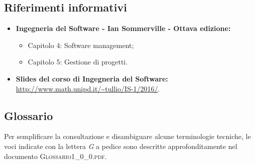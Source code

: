 \subsection{Riferimenti informativi}
\begin{itemize}
\item \textbf{Ingegneria del Software - Ian Sommerville - Ottava edizione:}
	\begin{itemize}
		\item Capitolo 4: Software management;
		\item Capitolo 5: Gestione di progetti.
	\end{itemize}
\item \textbf{Slides del corso di Ingegneria del Software:}\\
\url{http://www.math.unipd.it/~tullio/IS-1/2016/}.
\end{itemize}

\subsection{Glossario}
Per semplificare la consultazione e disambiguare alcune terminologie tecniche, le voci indicate con la lettera \textit{G} a pedice sono descritte approfonditamente nel documento \textsc{Glossario1\_0\_0.pdf}.